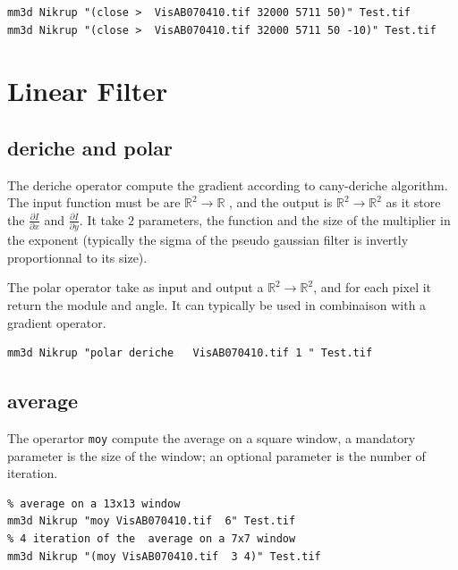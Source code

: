 \begin{verbatim}
mm3d Nikrup "(close >  VisAB070410.tif 32000 5711 50)" Test.tif
mm3d Nikrup "(close >  VisAB070410.tif 32000 5711 50 -10)" Test.tif
\end{verbatim}



\section{Linear Filter}


\subsection{deriche and polar}

The deriche operator compute the gradient according to cany-deriche algorithm.
The input function must be are $\mathbb{R}^2  \rightarrow  \mathbb{R}$ , and 
the output is  $\mathbb{R}^2  \rightarrow  \mathbb{R}^2$ as it store the 
$\frac{\partial I}{\partial x}$ and $\frac{\partial I}{\partial y}$.
It take $2$ parameters, the function and the size of the multiplier in
the exponent (typically the sigma of the pseudo gaussian filter is invertly
proportionnal to its size).

The polar operator take as input and output a $\mathbb{R}^2  \rightarrow  \mathbb{R}^2$, and
for each pixel it return the module and angle. It can typically be used in 
combinaison with a gradient operator.

\begin{verbatim}
mm3d Nikrup "polar deriche   VisAB070410.tif 1 " Test.tif
\end{verbatim}


\subsection{average}

The operartor {\tt moy} compute the average on a square window, a mandatory parameter 
is the size of the window; an optional parameter is the number of iteration.

\begin{verbatim}
% average on a 13x13 window
mm3d Nikrup "moy VisAB070410.tif  6" Test.tif
% 4 iteration of the  average on a 7x7 window
mm3d Nikrup "(moy VisAB070410.tif  3 4)" Test.tif
\end{verbatim}


